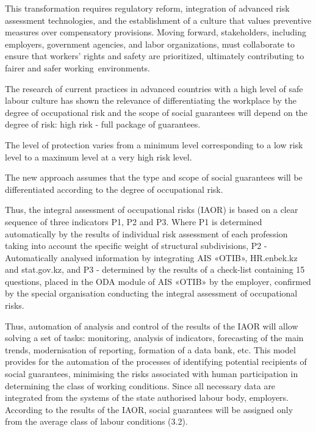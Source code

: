 \begin{multicols}{2}
This transformation requires regulatory reform, integration of advanced
risk assessment technologies, and the establishment of a culture that
values preventive measures over compensatory provisions. Moving forward,
stakeholders, including employers, government agencies, and labor
organizations, must collaborate to ensure that workers'{}
rights and safety are prioritized, ultimately contributing to fairer and
safer working~environments.

The research of current practices in advanced countries with a high
level of safe labour culture has shown the relevance of differentiating
the workplace by the degree of occupational risk and the scope of social
guarantees will depend on the degree of risk: high risk - full package
of guarantees.

The level of protection varies from a minimum level corresponding to a
low risk level to a maximum level at a very high risk level.

The new approach assumes that the type and scope of social guarantees
will be differentiated according to the degree of occupational risk.

Thus, the integral assessment of occupational risks (IAOR) is based on a
clear sequence of three indicators P1, P2 and P3. Where P1 is determined
automatically by the results of individual risk assessment of each
profession taking into account the specific weight of structural
subdivisions, P2 - Automatically analysed information by integrating AIS
«OTIB», HR.enbek.kz and stat.gov.kz, and P3 - determined by the results
of a check-list containing 15 questions, placed in the ODA module of AIS
«OTIB» by the employer, confirmed by the special organisation conducting
the integral assessment of occupational risks.

Thus, automation of analysis and control of the results of the IAOR will
allow solving a set of tasks: monitoring, analysis of indicators,
forecasting of the main trends, modernisation of reporting, formation of
a data bank, etc. This model provides for the automation of the
processes of identifying potential recipients of social guarantees,
minimising the risks associated with human participation in determining
the class of working conditions. Since all necessary data are integrated
from the systems of the state authorised labour body, employers.
According to the results of the IAOR, social guarantees will be assigned
only from the average class of labour conditions (3.2).


\end{multicols}
